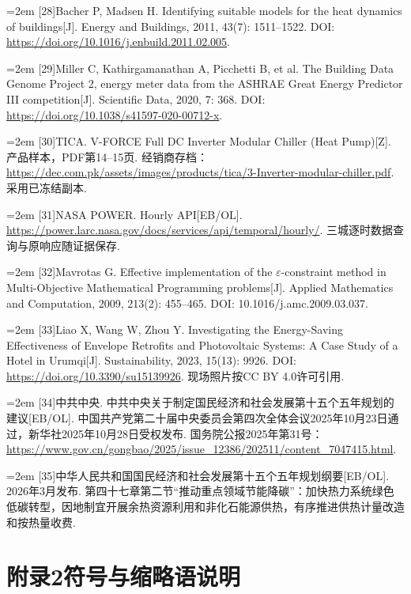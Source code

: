 \documentclass[12pt,a4paper]{article}
\newenvironment{refsectionflush}
  {\par\sloppy\setlength{\parindent}{0pt}\setlength{\parskip}{0pt}}
  {\par\fussy}
\newcommand{\refentry}[2]{%
  \par\noindent\hangindent=2em\hangafter=1
  [#1]\enspace #2\par}
\begin{document}
\begin{refsectionflush}
\refentry{28}{Bacher P, Madsen H. Identifying suitable models for the heat dynamics of buildings{[}J{]}. Energy and Buildings, 2011, 43(7): 1511--1522. DOI: \url{https://doi.org/10.1016/j.enbuild.2011.02.005}.}
\refentry{29}{Miller C, Kathirgamanathan A, Picchetti B, et al. The Building Data Genome Project 2, energy meter data from the ASHRAE Great Energy Predictor III competition{[}J{]}. Scientific Data, 2020, 7: 368. DOI: \url{https://doi.org/10.1038/s41597-020-00712-x}.}
\refentry{30}{TICA. V-FORCE Full DC Inverter Modular Chiller (Heat Pump){[}Z{]}. 产品样本，PDF第14--15页. 经销商存档：\url{https://dec.com.pk/assets/images/products/tica/3-Inverter-modular-chiller.pdf}. 采用已冻结副本.}
\refentry{31}{NASA POWER. Hourly API{[}EB/OL{]}. \url{https://power.larc.nasa.gov/docs/services/api/temporal/hourly/}. 三城逐时数据查询与原响应随证据保存.}
\refentry{32}{Mavrotas G. Effective implementation of the $\varepsilon$-constraint method in Multi-Objective Mathematical Programming problems{[}J{]}. Applied Mathematics and Computation, 2009, 213(2): 455--465. DOI: 10.1016/j.amc.2009.03.037.}
\refentry{33}{Liao X, Wang W, Zhou Y. Investigating the Energy-Saving Effectiveness of Envelope Retrofits and Photovoltaic Systems: A Case Study of a Hotel in Urumqi{[}J{]}. Sustainability, 2023, 15(13): 9926. DOI: \url{https://doi.org/10.3390/su15139926}. 现场照片按CC BY 4.0许可引用.}
\refentry{34}{中共中央. 中共中央关于制定国民经济和社会发展第十五个五年规划的建议{[}EB/OL{]}. 中国共产党第二十届中央委员会第四次全体会议2025年10月23日通过，新华社2025年10月28日受权发布. 国务院公报2025年第31号：\url{https://www.gov.cn/gongbao/2025/issue_12386/202511/content_7047415.html}.}
\refentry{35}{中华人民共和国国民经济和社会发展第十五个五年规划纲要{[}EB/OL{]}. 2026年3月发布. 第四十七章第二节“推动重点领域节能降碳”：加快热力系统绿色低碳转型，因地制宜开展余热资源利用和非化石能源供热，有序推进供热计量改造和按热量收费.}
\end{refsectionflush}



\begingroup
\let\paperAppendixContents\addcontentsline
\renewcommand{\addcontentsline}[3]{\phantomsection\paperAppendixContents{#1}{#2}{#3}}

\endgroup

\clearpage
\section*{附录2\quad 符号与缩略语说明}
{}
\end{document}
